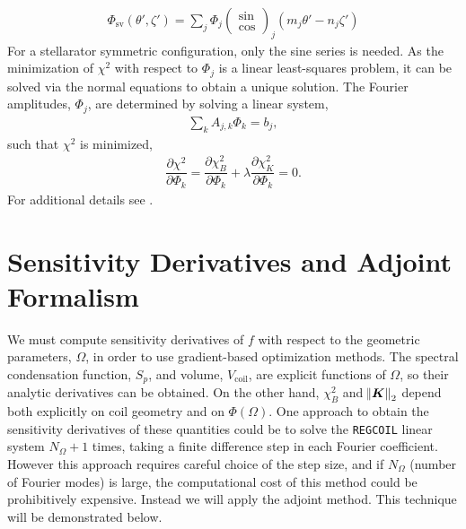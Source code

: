 \documentclass[aps,unsortedaddress]{revtex4-1}
\newcommand{\partder}[2]{\dfrac{\partial  #1}{\partial  #2}}
\begin{document}
\begin{gather}
\Phi_{\text{sv}}(\theta',\zeta') = \sum_j \Phi_j \left( \begin{array}{c} \sin \\ \cos \end{array} \right)_j (m_j \theta' - n_j \zeta')
\end{gather}
For a stellarator symmetric configuration, only the sine series is needed. As the minimization of $\chi^2$ with respect to $\Phi_{j}$ is a linear least-squares problem, it can be solved via the normal equations to obtain a unique solution. The Fourier amplitudes, $\Phi_j$, are determined by solving a linear system,
\begin{gather}
\sum_k A_{j,k} \Phi_k = b_j,
\label{forward}
\end{gather}
such that $\chi^2$ is minimized,
\begin{gather}
\partder{\chi^2}{\Phi_k} = \partder{\chi^2_B}{\Phi_k} + \lambda \partder{\chi^2_K}{\Phi_k} = 0.
\label{regcoil_minimization}
\end{gather}
For additional details see \cite{Landreman2017}.

\section{Sensitivity Derivatives and Adjoint Formalism}
\label{sect_adjoint}
We must compute sensitivity derivatives of $f$ with respect to the geometric parameters, $\Omega$, in order to use gradient-based optimization methods. The spectral condensation function, $S_p$, and volume, $V_{\text{coil}}$, are explicit functions of $\Omega$, so their analytic derivatives can be obtained. On the other hand, $\chi^2_B$ and $\norm{\bm{K}}_2$ depend both explicitly on coil geometry and on $\Phi(\Omega)$. One approach to obtain the sensitivity derivatives of these quantities could be to solve the \texttt{REGCOIL} linear system $N_{\Omega} +1$ times, taking a finite difference step in each Fourier coefficient. However this approach requires careful choice
of the step size, and if $N_{\Omega}$ (number of Fourier modes) is large, the computational cost of this method could be prohibitively expensive. Instead we will apply the adjoint method. This technique will be demonstrated below. 
\end{document}
